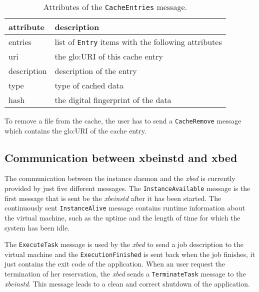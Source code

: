 \begin{table}[ht]
  \centering
  \begin{tabular}{@{}lp{}@{}}\toprule
    attribute        & \multicolumn{1}{l}{description} \\ \midrule %
    entries          & list of \texttt{Entry} items with the following attributes \\
    uri              & the \gls{glo:URI} of this cache entry \\
    description      & description of the entry \\
    type             & type of cached data \\
    hash             & the digital fingerprint of the data \\
    \bottomrule
  \end{tabular}
  \caption{Attributes of the \texttt{CacheEntries} message.}
  \label{tab:msg:cache-entries}
\end{table}

To   remove  a   file  from   the   cache,  the   user  has   to  send   a
\texttt{CacheRemove} message which contains the \gls{glo:URI} of the cache
entry.
 
\subsection{Communication between xbeinstd and xbed}

The  communication between  the  instance daemon  and  the \emph{xbed}  is
currently    provided   by    just   five    different    messages.    The
\texttt{InstanceAvailable} message  is the first  message that is  sent be
the  \emph{xbeinstd} after  it has  been started.   The  continuously sent
\texttt{InstanceAlive}  message  contains  runtime information  about  the
virtual machine, such  as the uptime and the length of  time for which the
system has been idle.

The \texttt{ExecuteTask} message is used  by the \emph{xbed} to send a job
description to  the virtual machine and  the \texttt{ExecutionFinished} is
sent back  when the job  finishes, it just  contains the exit code  of the
application. When an user request  the termination of her reservation, the
\emph{xbed}    sends    a    \texttt{TerminateTask}   message    to    the
\emph{xbeinstd}. This message leads to a clean and correct shutdown of the
application.



